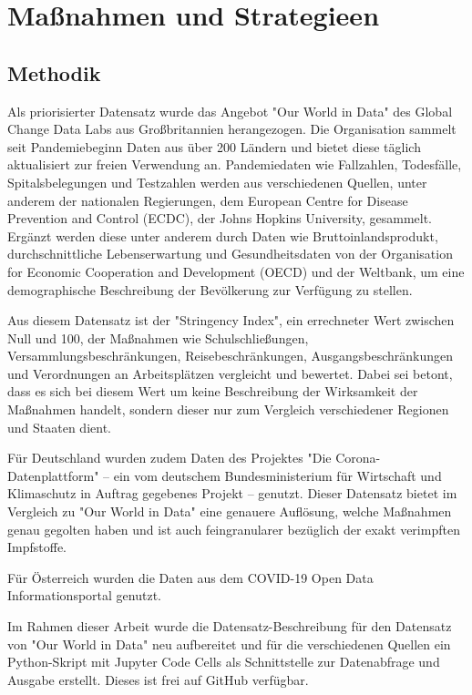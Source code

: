 \chapter{Maßnahmen und Strategieen}
\label{cha:daten}

\section{Methodik}
\label{sec:datasets}

Als priorisierter Datensatz wurde das Angebot "Our World in Data" des Global Change Data Labs aus Großbritannien herangezogen. Die Organisation sammelt seit Pandemiebeginn Daten aus über 200 Ländern und bietet diese täglich aktualisiert zur freien Verwendung an. Pandemiedaten wie Fallzahlen, Todesfälle, Spitalsbelegungen und Testzahlen werden aus verschiedenen Quellen, unter anderem der nationalen Regierungen, dem European Centre for Disease Prevention and Control (ECDC), der Johns Hopkins University, gesammelt. Ergänzt werden diese unter anderem durch Daten wie Bruttoinlandsprodukt, durchschnittliche Lebenserwartung und Gesundheitsdaten von der Organisation for Economic Cooperation and Development (OECD) und der Weltbank, um eine demographische Beschreibung der Bevölkerung zur Verfügung zu stellen. \cite{owidcoronavirus}

Aus diesem Datensatz ist der "Stringency Index", ein errechneter Wert zwischen Null und 100, der Maßnahmen wie Schulschließungen, Versammlungsbeschränkungen, Reisebeschränkungen, Ausgangsbeschränkungen und Verordnungen an Arbeitsplätzen vergleicht und bewertet. Dabei sei betont, dass es sich bei diesem Wert um keine Beschreibung der Wirksamkeit der Maßnahmen handelt, sondern dieser nur zum Vergleich verschiedener Regionen und Staaten dient. \cite{oxcgrt}

Für Deutschland wurden zudem Daten des Projektes "Die Corona-Datenplattform" -- ein vom deutschem Bundesministerium für Wirtschaft und Klimaschutz in Auftrag gegebenes Projekt -- genutzt. Dieser Datensatz bietet im Vergleich zu "Our World in Data" eine genauere Auflösung, welche Maßnahmen genau gegolten haben und ist auch feingranularer bezüglich der exakt verimpften Impfstoffe. \cite{coronadatenplattform_de}

Für Österreich wurden die Daten aus dem COVID-19 Open Data Informationsportal genutzt. \cite{opendata_at}

Im Rahmen dieser Arbeit wurde die Datensatz-Beschreibung für den Datensatz von "Our World in Data" neu aufbereitet und für die verschiedenen Quellen ein Python-Skript mit Jupyter Code Cells als Schnittstelle zur Datenabfrage und Ausgabe erstellt. Dieses ist frei auf GitHub verfügbar.

